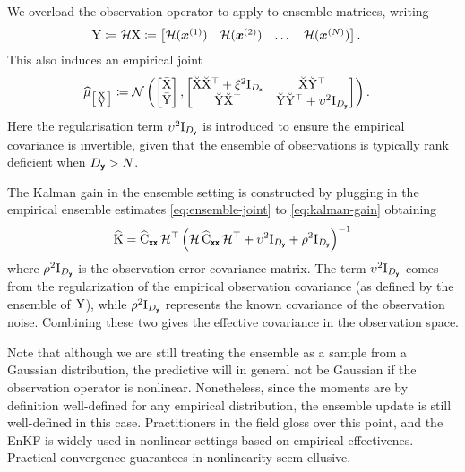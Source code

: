 \documentclass[wcp]{jmlr} %
\begin{document}
We overload the observation operator to apply to ensemble matrices, writing
\begin{align}
    \mathrm{Y}\coloneq\mathcal{H}\mathrm{X} &\coloneq \begin{bmatrix}\mathcal{H}(\boldsymbol{x}^{(1)}) & \mathcal{H}(\boldsymbol{x}^{(2)})& \dots& \mathcal{H}(\boldsymbol{x}^{(N)})\end{bmatrix}.
\end{align}
This also induces an empirical joint
\begin{align}
    \ELaw[{\left[\begin{smallmatrix}
        \mm{X}\\
        \mm{Y}
    \end{smallmatrix}\right]}] &\coloneq \Normal\left(\begin{bmatrix}
        \mmmean{X}\\
        \mmmean{Y}
    \end{bmatrix},
    \begin{bmatrix}
        \mmdev{X} \mmdev{X}^\top + \xi^2\mm{I}_{D_{\vrv{x}}} & \mmdev{X} \mmdev{Y}^\top \\
        \mmdev{Y} \mmdev{X}^\top  & \mmdev{Y} \mmdev{Y}^\top + \upsilon^2\mm{I}_{D_{\vrv{y}}}
    \end{bmatrix}
    \right).\label{eq:ensemble-joint}
\end{align}
Here the regularisation term \(\upsilon^2\mathrm{I}_{D_{\boldsymbol{\mathsf{y}}}}\) is introduced to ensure the empirical covariance is invertible, given that the ensemble of observations is typically rank deficient when \(D_{\boldsymbol{\mathsf{y}}}>N\).

The Kalman gain in the ensemble setting is constructed by plugging in the empirical ensemble estimates \eqref{eq:ensemble-joint} to \eqref{eq:kalman-gain} obtaining
\begin{align}
\widehat{\mathrm{K}}= \widehat{\mathrm{C}}_{\boldsymbol{\mathsf{xx}}}\, \mathcal{H}^\top \left(\mathcal{H}\,\widehat{\mathrm{C}}_{\boldsymbol{\mathsf{xx}}}\,\mathcal{H}^\top + \upsilon^2\mathrm{I}_{D_{\boldsymbol{\mathsf{y}}}} + \rho^2\mathrm{I}_{D_{\boldsymbol{\mathsf{y}}}}\right)^{-1}\label{eq:ensemble-kalman-gain}
\end{align}
where \(\rho^2\mathrm{I}_{D_{\boldsymbol{\mathsf{y}}}}\) is the observation error covariance matrix.
The term
\(\upsilon^2\mathrm{I}_{D_{\boldsymbol{\mathsf{y}}}}\) comes from the regularization of the empirical observation covariance (as defined by the ensemble of
\(\mathrm{Y}\)), while \(\rho^2\mathrm{I}_{D_{\boldsymbol{\mathsf{y}}}}\) represents the known covariance of the observation noise.
Combining these two gives the effective covariance in the observation space.

Note that although we are still treating the ensemble as a sample from a Gaussian distribution, the predictive will in general not be Gaussian if the observation operator is nonlinear.
Nonetheless, since the moments are by definition well-defined for any empirical distribution, the ensemble update is still well-defined in this case.
Practitioners in the field gloss over this point, and the EnKF is widely used in nonlinear settings based on empirical effectivenes.
Practical convergence guarantees in nonlinearity seem ellusive.
\end{document}
